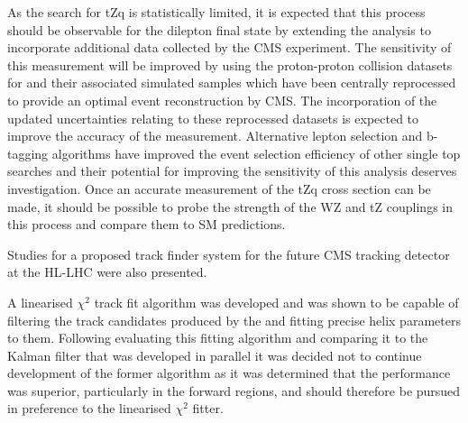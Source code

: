 As the search for tZq is statistically limited, it is expected that this process should be observable for the dilepton final state by extending the analysis to incorporate additional data collected by the CMS experiment.
The sensitivity of this measurement will be improved by using the proton-proton collision datasets for and their associated simulated samples which have been centrally reprocessed to provide an optimal event reconstruction by CMS.
The incorporation of the updated uncertainties relating to these reprocessed datasets is  expected to improve the accuracy of the measurement.
Alternative lepton selection and b-tagging algorithms have improved the event selection efficiency of other single top searches and their potential for improving the sensitivity of this analysis deserves investigation.
Once an accurate measurement of the tZq cross section can be made, it should be possible to probe  the strength of the WZ and tZ couplings in this process and compare them to SM predictions.

%


Studies  
 for a proposed track finder system for the future CMS tracking detector at the HL-LHC were also presented.

A linearised $\chi^{2}$ track fit algorithm was developed and was shown to be capable of filtering the track candidates produced by the \HT and fitting precise helix parameters to them.
Following evaluating this fitting algorithm and comparing it to the Kalman filter that was developed in parallel it was decided not to continue development of the former algorithm as it was determined that the \KF performance was superior, particularly in the forward regions, and should therefore be pursued in preference to the linearised $\chi^{2}$ fitter.

